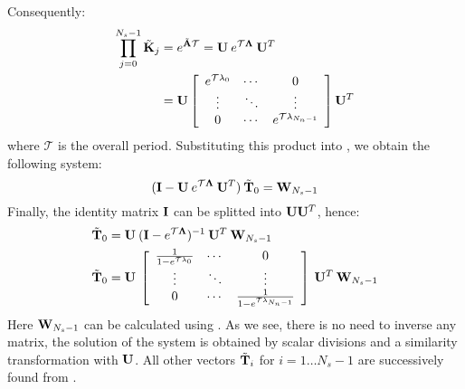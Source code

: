 Consequently:
\begin{align*}
  \prod_{j = 0}^{N_s - 1} \tilde{\mathbf{K}}_j & = e^{\tilde{\mathbf{A}} \mathcal{T}} = \mathbf{U} \: e^{\mathcal{T} \mathbf{\Lambda}} \: \mathbf{U}^T \\
    & = \mathbf{U} \left[
      \begin{array}{ccc}
        e^{\mathcal{T} \lambda_0} & \cdots & 0 \\
        \vdots & \ddots & \vdots \\
        0 & \cdots & e^{\mathcal{T} \lambda_{N_n - 1}}
      \end{array}
    \right] \mathbf{U}^T
\end{align*}
where $\mathcal{T}$ is the overall period. Substituting this product into , we obtain the following system:
\[
  (\mathbf{I} - \mathbf{U} \: e^{\mathcal{T} \mathbf{\Lambda}} \: \mathbf{U}^T) \: \tilde{\mathbf{T}}_0 = \mathbf{W}_{N_s - 1}
\]
Finally, the identity matrix $\mathbf{I}$ can be splitted into $\mathbf{U} \mathbf{U}^T$, hence:
\begin{align*}
  & \tilde{\mathbf{T}}_0 = \mathbf{U} \: (\mathbf{I} - e^{\mathcal{T} \mathbf{\Lambda}})^{-1} \: \mathbf{U}^T \: \mathbf{W}_{N_s - 1} \\
  & \tilde{\mathbf{T}}_0 = \mathbf{U} \: \left[
      \begin{array}{ccc}
        \frac{1}{1 - e^{\mathcal{T} \lambda_0}} & \cdots & 0 \\
        \vdots & \ddots & \vdots \\
        0 & \cdots & \frac{1}{1 - e^{\mathcal{T} \lambda_{N_n - 1}}}
      \end{array}
    \right] \: \mathbf{U}^T \: \mathbf{W}_{N_s - 1}
\end{align*}
Here $\mathbf{W}_{N_s - 1}$ can be calculated using . As we see, there is no need to inverse any matrix, the solution of the system is obtained by scalar divisions and a similarity transformation with $\mathbf{U}$. All other vectors $\tilde{\mathbf{T}}_i$ for \mbox{$i = 1 \dots N_s - 1$} are successively found from .

